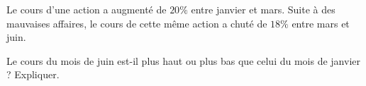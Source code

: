 
\begin{exercice}\label{exosmath-0437}

    Le cours d'une action a augmenté de \( 20\%\) entre janvier et mars. Suite à des mauvaises affaires, le cours de cette même action a chuté de \( 18\%\) entre mars et juin.

    Le cours du mois de juin est-il plus haut ou plus bas que celui du mois de janvier ? Expliquer.

\end{exercice}
